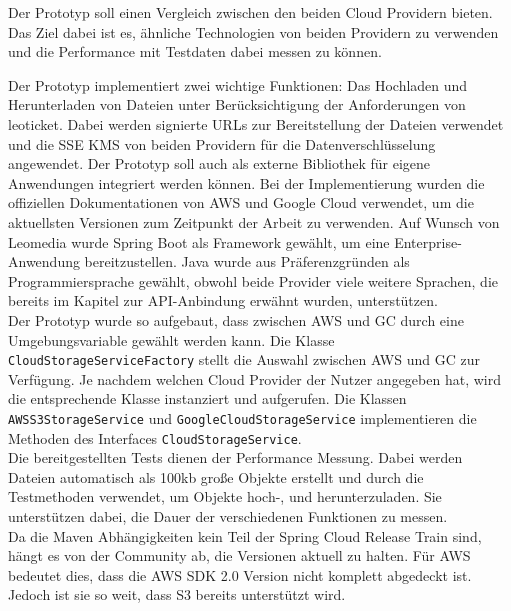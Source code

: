 Der Prototyp soll einen Vergleich zwischen den beiden Cloud Providern bieten. Das Ziel dabei ist es, ähnliche Technologien von beiden Providern zu verwenden und die Performance mit Testdaten dabei messen zu können. 

Der Prototyp implementiert zwei wichtige Funktionen: Das Hochladen und Herunterladen von Dateien unter Berücksichtigung der Anforderungen von leoticket. Dabei werden signierte URLs zur Bereitstellung der Dateien verwendet und die SSE KMS von beiden Providern für die Datenverschlüsselung angewendet. Der Prototyp soll auch als externe Bibliothek für eigene Anwendungen integriert werden können. Bei der Implementierung wurden die offiziellen Dokumentationen von AWS und Google Cloud verwendet, um die aktuellsten Versionen zum Zeitpunkt der Arbeit zu verwenden. Auf Wunsch von Leomedia wurde Spring Boot als Framework gewählt, um eine Enterprise-Anwendung bereitzustellen. Java wurde aus Präferenzgründen als Programmiersprache gewählt, obwohl beide Provider viele weitere Sprachen, die bereits im Kapitel zur API-Anbindung erwähnt wurden, unterstützen.\\

Der Prototyp wurde so aufgebaut, dass zwischen AWS und GC durch eine Umgebungsvariable gewählt werden kann. Die Klasse \verb|CloudStorageServiceFactory| stellt die Auswahl zwischen AWS und GC zur Verfügung. Je nachdem welchen Cloud Provider der Nutzer angegeben hat, wird die entsprechende Klasse instanziert und aufgerufen. Die Klassen \verb|AWSS3StorageService| und \verb|GoogleCloudStorageService| implementieren die Methoden des Interfaces \verb|CloudStorageService|.\\

Die bereitgestellten Tests dienen der Performance Messung. Dabei werden Dateien automatisch als 100kb große Objekte erstellt und durch die Testmethoden verwendet, um Objekte hoch-, und herunterzuladen. Sie unterstützen dabei, die Dauer der verschiedenen Funktionen zu messen.\\

Da die Maven Abhängigkeiten kein Teil der Spring Cloud Release Train sind, hängt es von der Community ab, die Versionen aktuell zu halten. Für AWS bedeutet dies, dass die AWS SDK 2.0 Version nicht komplett abgedeckt ist. Jedoch ist sie so weit, dass S3 bereits unterstützt wird. 